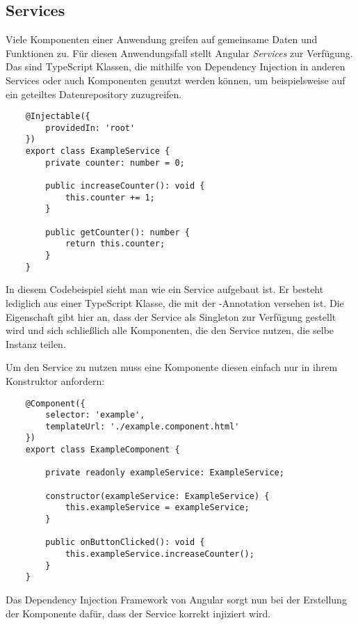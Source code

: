 \subsection{Services}

Viele Komponenten einer Anwendung greifen auf gemeinsame Daten und Funktionen zu. Für diesen Anwendungsfall stellt Angular \textit{Services} zur Verfügung. Das sind TypeScript Klassen, die mithilfe von Dependency Injection in anderen Services oder auch Komponenten genutzt werden können, um beispielsweise auf ein geteiltes Datenrepository zuzugreifen.

\begin{verbatim}
    @Injectable({
        providedIn: 'root'
    })
    export class ExampleService {
        private counter: number = 0;
        
        public increaseCounter(): void {
            this.counter += 1;
        }

        public getCounter(): number {
            return this.counter;
        }
    }
\end{verbatim}

In diesem Codebeispiel sieht man wie ein Service aufgebaut ist. Er besteht lediglich aus einer TypeScript Klasse, die mit der -Annotation versehen ist. Die Eigenschaft  gibt hier an, dass der Service als Singleton zur Verfügung gestellt wird und sich schließlich alle Komponenten, die den Service nutzen, die selbe Instanz teilen.

Um den Service zu nutzen muss eine Komponente diesen einfach nur in ihrem Konstruktor anfordern:

\begin{verbatim}
    @Component({
        selector: 'example',
        templateUrl: './example.component.html'
    })
    export class ExampleComponent {

        private readonly exampleService: ExampleService;

        constructor(exampleService: ExampleService) {
            this.exampleService = exampleService;
        }

        public onButtonClicked(): void {
            this.exampleService.increaseCounter();
        }
    }
\end{verbatim}

Das Dependency Injection Framework von Angular sorgt nun bei der Erstellung der Komponente dafür, dass der Service korrekt injiziert wird.

